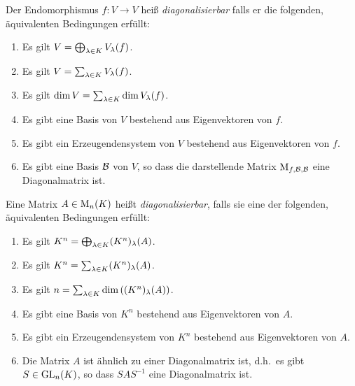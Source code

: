 \begin{definition}
  Der Endomorphismus $f \colon V \to V$ heiß \emph{diagonalisierbar} falls er die folgenden, äquivalenten Bedingungen erfüllt:
  \begin{enumerate}[label = \arabic*.]
    \item
      Es gilt $V = \bigoplus_{\lambda \in K} V_{\lambda}(f)$.
    \item
      Es gilt $V = \sum_{\lambda \in K} V_{\lambda}(f)$.
    \item
      Es gilt $\dim V = \sum_{\lambda \in K} \dim V_{\lambda}(f)$.
    \item
      Es gibt eine Basis von $V$ bestehend aus Eigenvektoren von $f$.
    \item
      Es gibt ein Erzeugendensystem von $V$ bestehend aus Eigenvektoren von $f$.
    \item
      Es gibt eine Basis $\mathcal{B}$ von $V$, so dass die darstellende Matrix $\operatorname{M}_{f, \mathcal{B}, \mathcal{B}}$ eine Diagonalmatrix ist.
  \end{enumerate}
  Eine Matrix $A \in \operatorname{M}_{n}(K)$ heißt \emph{diagonalisierbar}, falls sie eine der folgenden, äquivalenten Bedingungen erfüllt:
  \begin{enumerate}[label = \arabic*.]
    \item
      Es gilt $K^n = \bigoplus_{\lambda \in K} (K^n)_{\lambda}(A)$.
    \item
      Es gilt $K^n = \sum_{\lambda \in K} (K^n)_{\lambda}(A)$.
    \item
      Es gilt $n = \sum_{\lambda \in K} \dim \left((K^n)_{\lambda}(A) \right)$.
    \item
      Es gibt eine Basis von $K^n$ bestehend aus Eigenvektoren von $A$.
    \item
      Es gibt ein Erzeugendensystem von $K^n$ bestehend aus Eigenvektoren von $A$.
    \item
      Die Matrix $A$ ist ähnlich zu einer Diagonalmatrix ist, d.h.\ es gibt $S \in \operatorname{GL}_{n}(K)$, so dass $S A S^{-1}$ eine Diagonalmatrix ist.
  \end{enumerate}
\end{definition}

